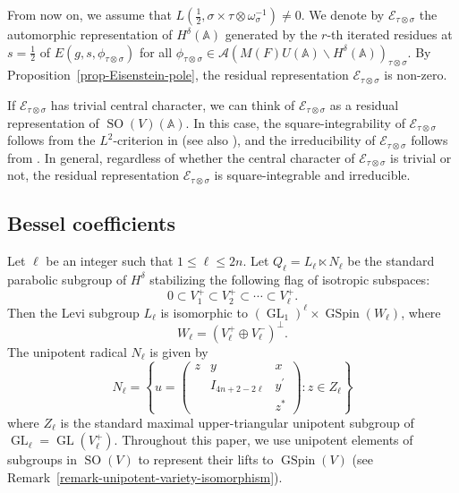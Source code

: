 \documentclass[12pt]{amsart}
\newcommand{\A}{\mathbb{A}}
\newcommand{\CE}{{\mathcal{E}}}
\theoremstyle{remark}
\DeclareMathOperator{\GL}{GL}
\DeclareMathOperator{\SO}{SO}
\DeclareMathOperator{\GSpin}{GSpin}
\newcommand{\bs}{\backslash}
\begin{document}
From now on, we assume that  $L(\frac{1}{2}, \sigma\times \tau\otimes \omega_\sigma^{-1})\neq 0$.
We denote by $\CE_{\tau\otimes \sigma}$ the automorphic representation of $H^\delta(\A)$ generated by the $r$-th iterated  residues at $s=\frac{1}{2}$ of $E(g, s, \phi_{\tau\otimes\sigma})$ for all $\phi_{\tau\otimes\sigma}\in \mathcal{A}(M(F)U(\A)\bs H^\delta(\A))_{\tau\otimes \sigma}$.
By Proposition~\ref{prop-Eisenstein-pole}, the residual representation $\CE_{\tau\otimes \sigma}$ is non-zero.

If $\CE_{\tau\otimes \sigma}$ has trivial central character, we can think of $\CE_{\tau\otimes \sigma}$ as a residual representation of $\SO(V)(\A)$. In this case, the square-integrability of $\CE_{\tau\otimes \sigma}$ follows from the $L^2$-criterion in \cite[Lemma I.4.11]{MoglinWaldspurger1995} (see also \cite[Theorem 6.1]{JiangLiuZhang2013}), and the irreducibility of $\CE_{\tau\otimes \sigma}$ follows from \cite[Theorem A]{Moeglin2011}. In general, regardless of whether the central character of $\CE_{\tau\otimes \sigma}$ is trivial or not, the residual representation $\CE_{\tau\otimes \sigma}$ is square-integrable and irreducible.  

  

\subsection{Bessel coefficients}
\label{subsection-Bessel-coefficient}
Let $\ell$ be an integer such that $1\le \ell \le 2n$. Let $Q_\ell=L_{{\ell}}\ltimes N_{{\ell}}$ be the standard parabolic subgroup of $H^\delta$ stabilizing the following flag of isotropic subspaces:
\begin{equation*}
0\subset V_1^+ \subset V_2^+ \subset \cdots \subset 	V_{\ell}^+.
\end{equation*}
Then the Levi subgroup $L_{\ell}$ is isomorphic to $(\GL_1)^\ell \times \GSpin(W_\ell)$, where
\begin{equation}
\label{eq-W_ell}
W_{\ell}=(V_\ell^+ \oplus 	V_\ell^-)^\perp.
\end{equation}
The unipotent radical $N_{\ell}$ is given by 
\begin{equation*}
N_{\ell} = 	\left\{ u=\begin{pmatrix} z & y &x\\ &I_{4n+2-2\ell} &y^\prime\\ &&z^*\end{pmatrix}: z\in Z_{\ell} \right\}
\end{equation*}
where $Z_{\ell}$ is the standard maximal upper-triangular unipotent subgroup of $\GL_{\ell}=\GL(V_{\ell}^+)$. Throughout this paper, we use unipotent elements of subgroups in $\SO(V)$ to represent their lifts to $\GSpin(V)$ (see Remark~\ref{remark-unipotent-variety-isomorphism}). 
\end{document}
